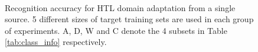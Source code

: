 \begin{figure}[th]
{}
\\
\caption{Recognition accuracy for HTL domain adaptation from a single source. 5 different sizes of target training sets are used in each group of experiments. A, D, W and C denote the 4 subsets in Table \ref{tab:class_info} respectively.}
\label{fig:exp}
\end{figure}


